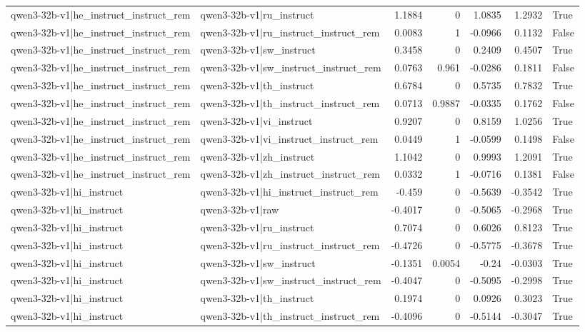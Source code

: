 \begin{table}
\begin{tabular}{l l r r r r l}
qwen3-32b-v1|he_instruct_instruct_rem & qwen3-32b-v1|ru_instruct & 1.1884 & 0 & 1.0835 & 1.2932 & True \\
qwen3-32b-v1|he_instruct_instruct_rem & qwen3-32b-v1|ru_instruct_instruct_rem & 0.0083 & 1 & -0.0966 & 0.1132 & False \\
qwen3-32b-v1|he_instruct_instruct_rem & qwen3-32b-v1|sw_instruct & 0.3458 & 0 & 0.2409 & 0.4507 & True \\
qwen3-32b-v1|he_instruct_instruct_rem & qwen3-32b-v1|sw_instruct_instruct_rem & 0.0763 & 0.961 & -0.0286 & 0.1811 & False \\
qwen3-32b-v1|he_instruct_instruct_rem & qwen3-32b-v1|th_instruct & 0.6784 & 0 & 0.5735 & 0.7832 & True \\
qwen3-32b-v1|he_instruct_instruct_rem & qwen3-32b-v1|th_instruct_instruct_rem & 0.0713 & 0.9887 & -0.0335 & 0.1762 & False \\
qwen3-32b-v1|he_instruct_instruct_rem & qwen3-32b-v1|vi_instruct & 0.9207 & 0 & 0.8159 & 1.0256 & True \\
qwen3-32b-v1|he_instruct_instruct_rem & qwen3-32b-v1|vi_instruct_instruct_rem & 0.0449 & 1 & -0.0599 & 0.1498 & False \\
qwen3-32b-v1|he_instruct_instruct_rem & qwen3-32b-v1|zh_instruct & 1.1042 & 0 & 0.9993 & 1.2091 & True \\
qwen3-32b-v1|he_instruct_instruct_rem & qwen3-32b-v1|zh_instruct_instruct_rem & 0.0332 & 1 & -0.0716 & 0.1381 & False \\
qwen3-32b-v1|hi_instruct & qwen3-32b-v1|hi_instruct_instruct_rem & -0.459 & 0 & -0.5639 & -0.3542 & True \\
qwen3-32b-v1|hi_instruct & qwen3-32b-v1|raw & -0.4017 & 0 & -0.5065 & -0.2968 & True \\
qwen3-32b-v1|hi_instruct & qwen3-32b-v1|ru_instruct & 0.7074 & 0 & 0.6026 & 0.8123 & True \\
qwen3-32b-v1|hi_instruct & qwen3-32b-v1|ru_instruct_instruct_rem & -0.4726 & 0 & -0.5775 & -0.3678 & True \\
qwen3-32b-v1|hi_instruct & qwen3-32b-v1|sw_instruct & -0.1351 & 0.0054 & -0.24 & -0.0303 & True \\
qwen3-32b-v1|hi_instruct & qwen3-32b-v1|sw_instruct_instruct_rem & -0.4047 & 0 & -0.5095 & -0.2998 & True \\
qwen3-32b-v1|hi_instruct & qwen3-32b-v1|th_instruct & 0.1974 & 0 & 0.0926 & 0.3023 & True \\
qwen3-32b-v1|hi_instruct & qwen3-32b-v1|th_instruct_instruct_rem & -0.4096 & 0 & -0.5144 & -0.3047 & True \\

\end{tabular}
\end{table}
